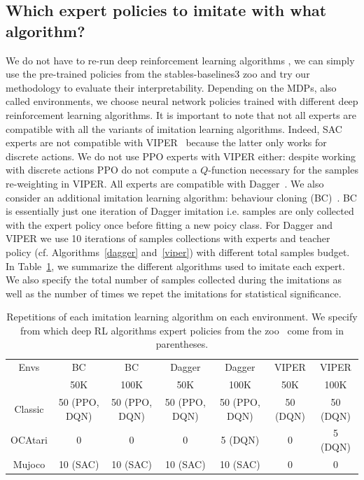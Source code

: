 \subsection{Which expert policies to imitate with what algorithm?}
We do not have to re-run deep reinforcement learning algorithms \cite{dqn,ppo,deep-rl-relu1}, we can simply use the pre-trained policies from the stables-baselines3 zoo \cite{zoo} and try our methodology to evaluate their interpretability.
Depending on the MDPs, also called environments, we choose neural network policies trained with different deep reinforcement learning algorithms.
It is important to note that not all experts are compatible with all the variants of imitation learning algorithms.
Indeed, SAC experts \cite{deep-rl-relu1} are not compatible with VIPER~\cite{viper} because the latter only works for discrete actions.
We do not use PPO experts with VIPER either: despite working with discrete actions PPO do not compute a $Q$-function necessary for the samples re-weighting in VIPER.
All experts are compatible with Dagger~\cite{dagger}.
We also consider an additional imitation learning algorithm: behaviour cloning (BC)~\cite{behaviour-cloning}.
BC is essentially just one iteration of Dagger imitation i.e. samples are only collected with the expert policy once before fitting a new poicy class.
For Dagger and VIPER we use 10 iterations of samples collections with experts and teacher policy (cf. Algorithms~\ref{dagger} and~\ref{viper}) with different total samples budget.
In Table~\ref{tab:repet-distill}, we summarize the different algorithms used to imitate each expert.
We also specify the total number of samples collected during the imitations as well as the number of times we repet the imitations for statistical significance.

\begin{table}
  \centering
  \footnotesize
  \begin{tabular}{c|cccccc}
  \toprule
  Envs & BC & BC & Dagger & Dagger & VIPER & VIPER\\
   & 50K & 100K & 50K & 100K & 50K & 100K\\
  \midrule
  Classic& 50 (PPO, DQN)& 50 (PPO, DQN)& 50 (PPO, DQN)& 50 (PPO, DQN)&  50 (DQN) & 50 (DQN)\\
  OCAtari& 0 & 0 & 0 & 5 (DQN)&  0 & 5 (DQN)\\
  Mujoco& 10 (SAC)& 10 (SAC)& 10 (SAC)& 10 (SAC)&  0 & 0\\
  \bottomrule
  \end{tabular}
  \caption{Repetitions of each imitation learning algorithm on each environment. We specify from which deep RL algorithms expert policies from the zoo~\citep{zoo} come from in parentheses.}
  \label{tab:repet-distill}
\end{table}

